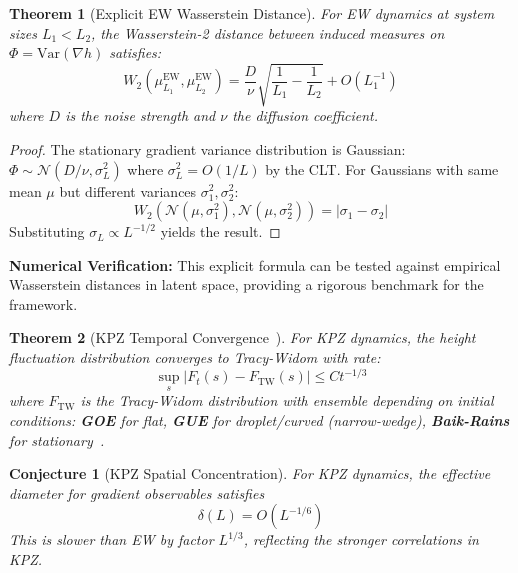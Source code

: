 \documentclass[aps,pre,reprint,amsmath,amssymb,superscriptaddress]{revtex4-2}
\newtheorem{conjecture}{Conjecture}
\newtheorem{theorem}{Theorem}
\begin{document}
\begin{theorem}[Explicit EW Wasserstein Distance]
\label{thm:EW-wasserstein}
For EW dynamics at system sizes $L_1 < L_2$, the Wasserstein-2 distance between induced measures on $\Phi = \text{Var}(\nabla h)$ satisfies:
\begin{equation}
W_2(\mu^{\text{EW}}_{L_1}, \mu^{\text{EW}}_{L_2}) = \frac{D}{\nu}\sqrt{\frac{1}{L_1} - \frac{1}{L_2}} + O(L_1^{-1})
\end{equation}
where $D$ is the noise strength and $\nu$ the diffusion coefficient.
\end{theorem}

\begin{proof}
The stationary gradient variance distribution is Gaussian: $\Phi \sim \mathcal{N}(D/\nu, \sigma^2_L)$ where $\sigma^2_L = O(1/L)$ by the CLT. For Gaussians with same mean $\mu$ but different variances $\sigma_1^2, \sigma_2^2$:
\begin{equation}
W_2(\mathcal{N}(\mu,\sigma_1^2), \mathcal{N}(\mu,\sigma_2^2)) = |\sigma_1 - \sigma_2|
\end{equation}
Substituting $\sigma_L \propto L^{-1/2}$ yields the result.
\end{proof}

\textbf{Numerical Verification:} This explicit formula can be tested against empirical Wasserstein distances in latent space, providing a rigorous benchmark for the framework.

\begin{theorem}[KPZ Temporal Convergence~\cite{FerrariSpohn2006}]
\label{thm:KPZ-temporal}
For KPZ dynamics, the height fluctuation distribution converges to Tracy-Widom with rate:
\begin{equation}
\sup_s |F_t(s) - F_{\text{TW}}(s)| \leq C t^{-1/3}
\end{equation}
where $F_{\text{TW}}$ is the Tracy-Widom distribution with ensemble depending on initial conditions: \textbf{GOE} for flat, \textbf{GUE} for droplet/curved (narrow-wedge), \textbf{Baik-Rains} for stationary~\cite{Johansson2000,CorwinQuastel2013}.
\end{theorem}

\begin{conjecture}[KPZ Spatial Concentration]
\label{conj:KPZ-rate}
For KPZ dynamics, the effective diameter for gradient observables satisfies
\begin{equation}
\delta(L) = O(L^{-1/6})
\end{equation}
This is slower than EW by factor $L^{1/3}$, reflecting the stronger correlations in KPZ.
\end{conjecture}
\end{document}
